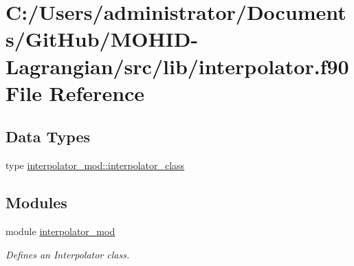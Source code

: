 \hypertarget{interpolator_8f90}{}\section{C\+:/\+Users/administrator/\+Documents/\+Git\+Hub/\+M\+O\+H\+I\+D-\/\+Lagrangian/src/lib/interpolator.f90 File Reference}
\label{interpolator_8f90}
\subsection*{Data Types}
\begin{DoxyCompactItemize}
\item 
type \mbox{\hyperlink{structinterpolator__mod_1_1interpolator__class}{interpolator\+\_\+mod\+::interpolator\+\_\+class}}
\end{DoxyCompactItemize}
\subsection*{Modules}
\begin{DoxyCompactItemize}
\item 
module \mbox{\hyperlink{namespaceinterpolator__mod}{interpolator\+\_\+mod}}
\begin{DoxyCompactList}\small\item\em Defines an Interpolator class. \end{DoxyCompactList}\end{DoxyCompactItemize}
